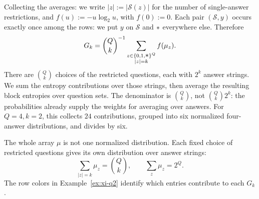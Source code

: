 \documentclass[11pt]{article}
\newcommand{\wild}{\mathord{\text{\normalsize$\ast$}}}
\begin{document}
Collecting the averages:
we write $|z|:=|\mathcal S(z)|$ for the number of single-answer restrictions,
and $f(u):=-u\log_2u$, with $f(0):=0$. Each pair $(\mathcal S,y)$ occurs
exactly once among the rows: we put $y$ on $\mathcal S$ and $\wild$
everywhere else. Therefore
\begin{equation}\label{eq:Xi-Gk}
  G_k=\binom Qk^{-1}
       \sum_{\substack{z\in\{0,1,\wild\}^Q\\|z|=k}}f(\mu_z).
\end{equation}
There are $\binom Qk$ choices of the restricted questions, each with $2^k$
answer strings. We sum the entropy contributions over those strings, then
average the resulting block entropies over question sets. The denominator
is $\binom Qk$, not $\binom Qk2^k$: the probabilities already supply the
weights for averaging over answers. For $Q=4,k=2$, this collects $24$
contributions, grouped into six normalized four-answer distributions,
and divides by six.

The whole array $\mu$ is not one normalized distribution. Each fixed choice
of restricted questions gives its own distribution over answer strings:
\begin{equation}
  \sum_{|z|=k}\mu_z=\binom Qk,
  \qquad \sum_z \mu_z=2^Q.
\end{equation}
The row colors in Example~\ref{ex:xi-q2} identify which entries
contribute to each $G_k$.
\end{document}

